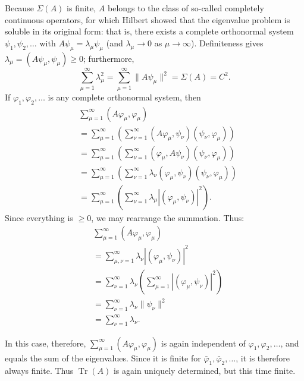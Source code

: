 \documentclass[fontsize=13pt,twoside,openany,headings=normal,parskip=false,bookmarkpackage=false,DIV=calc]{scrbook}
\begin{document}
Because $\Sigma(A)$ is finite, $A$ belongs to the class of so-called completely continuous operators, for which Hilbert showed that the eigenvalue problem is soluble in its original form: that is, there exists a complete orthonormal system $\psi_1,\psi_2,\ldots$ with $A\psi_\mu=\lambda_\mu\psi_\mu$ (and $\lambda_\mu\to0$ as $\mu\to\infty$). Definiteness gives $\lambda_\mu=(A\psi_\mu,\psi_\mu)\geq0$; furthermore,
\[
\sum_{\mu=1}^{\infty}\lambda_\mu^2
=\sum_{\mu=1}^{\infty}\|A\psi_\mu\|^2=\Sigma(A)=C^2.
\]
If $\varphi_1,\varphi_2,\ldots$ is any complete orthonormal system, then
\begin{align*}
&\sum_{\mu=1}^{\infty}(A\varphi_\mu,\varphi_\mu)\\
&=\sum_{\mu=1}^{\infty}\left(\sum_{\nu=1}^{\infty}
(A\varphi_\mu,\psi_\nu)(\psi_\nu,\varphi_\mu)\right)\\
&=\sum_{\mu=1}^{\infty}\left(\sum_{\nu=1}^{\infty}
(\varphi_\mu,A\psi_\nu)(\psi_\nu,\varphi_\mu)\right)\\
&=\sum_{\mu=1}^{\infty}\left(\sum_{\nu=1}^{\infty}
\lambda_\nu(\varphi_\mu,\psi_\nu)(\psi_\nu,\varphi_\mu)\right)\\
&=\sum_{\mu=1}^{\infty}\left(\sum_{\nu=1}^{\infty}
\lambda_\mu|(\varphi_\mu,\psi_\nu)|^2\right).
\end{align*}
Since everything is $\geq0$, we may rearrange the summation. Thus:
\begin{align*}
&\sum_{\mu=1}^{\infty}(A\varphi_\mu,\varphi_\mu)\\
&=\sum_{\mu,\nu=1}^{\infty}\lambda_\nu|(\varphi_\mu,\psi_\nu)|^2\\
&=\sum_{\nu=1}^{\infty}\lambda_\nu
\left(\sum_{\mu=1}^{\infty}|(\varphi_\mu,\psi_\nu)|^2\right)\\
&=\sum_{\nu=1}^{\infty}\lambda_\nu\|\psi_\nu\|^2\\
&=\sum_{\nu=1}^{\infty}\lambda_\nu.
\end{align*}

\hypertarget{origpage-99}{}%
In this case, therefore, $\sum_{\mu=1}^{\infty}(A\varphi_\mu,\varphi_\mu)$ is again independent of $\varphi_1,\varphi_2,\ldots$, and equals the sum of the eigenvalues. Since it is finite for $\bar\varphi_1,\bar\varphi_2,\ldots$, it is therefore always finite. Thus $\operatorname{Tr}(A)$ is again uniquely determined, but this time finite.
\end{document}
